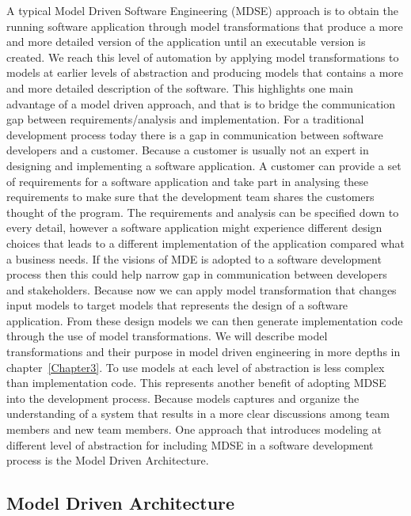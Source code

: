A typical Model Driven Software Engineering (MDSE) approach is to obtain the
running software application through model transformations that produce a more
and more detailed version of the application until an executable version is
created. We reach this level of automation by applying model transformations to
models at earlier levels of abstraction and producing models that contains a
more and more detailed description of the software. This highlights one main
advantage of a model driven approach, and that is to bridge the communication
gap between requirements/analysis and implementation\cite{Brown2008}. For a
traditional development process today there is a gap in communication between
software developers and a customer. Because a customer is usually not an expert
in designing and implementing a software application. A customer can provide a
set of requirements for a software application and take part in analysing these
requirements to make sure that the development team shares the customers thought
of the program. The requirements and analysis can be specified down to every
detail, however a software application might experience different design choices
that leads to a different implementation of the application compared what a
business needs. If the visions of MDE is adopted to a software development
process then this could help narrow gap in communication between developers and
stakeholders. Because now we can apply model transformation that changes input
models to target models that represents the design of a software application.
From these design models we can then generate implementation code through the use
of model transformations. We will describe model transformations and their
purpose in model driven engineering in more depths in chapter~\ref{Chapter3}.
To use models at each level of abstraction is less complex than implementation
code. This represents another benefit of adopting MDSE into the development
process. Because models captures and organize the understanding of a system that
results in a more clear discussions among team members and new team members. 
One approach that introduces modeling at different level of abstraction for
including MDSE in a software development process is the Model Driven
Architecture.

\subsection{Model Driven Architecture}

